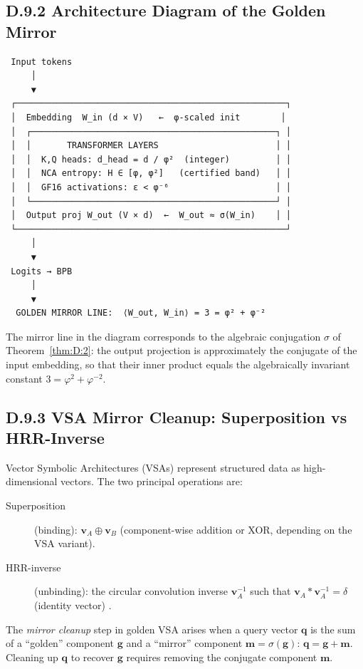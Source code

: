 \subsection*{D.9.2  Architecture Diagram of the Golden Mirror}

\begin{verbatim}
 Input tokens
     │
     ▼
 ┌─────────────────────────────────────────────────────┐
 │  Embedding  W_in (d × V)   ←  φ-scaled init        │
 │  ┌────────────────────────────────────────────────┐ │
 │  │       TRANSFORMER LAYERS                       │ │
 │  │  K,Q heads: d_head = d / φ²  (integer)         │ │
 │  │  NCA entropy: H ∈ [φ, φ²]   (certified band)   │ │
 │  │  GF16 activations: ε < φ⁻⁶                     │ │
 │  └────────────────────────────────────────────────┘ │
 │  Output proj W_out (V × d)  ←  W_out ≈ σ(W_in)    │ │
 └─────────────────────────────────────────────────────┘
     │
     ▼
 Logits → BPB
     │
     ▼
  GOLDEN MIRROR LINE:  ⟨W_out, W_in⟩ = 3 = φ² + φ⁻²
\end{verbatim}

\noindent The mirror line in the diagram corresponds to the algebraic conjugation
$\sigma$ of Theorem~\ref{thm:D:2}: the output projection is approximately the
conjugate of the input embedding, so that their inner product equals the
algebraically invariant constant $3 = \varphi^2 + \varphi^{-2}$.

\subsection*{D.9.3  VSA Mirror Cleanup: Superposition vs HRR-Inverse}

Vector Symbolic Architectures (VSAs) \cite{gayler_vsa_2003,kanerva_hyperdimensional}
represent structured data as high-dimensional vectors.  The two principal
operations are:
\begin{description}
  \item[Superposition] (binding): $\mathbf{v}_A \oplus \mathbf{v}_B$ (component-wise
    addition or XOR, depending on the VSA variant).
  \item[HRR-inverse] (unbinding): the circular convolution inverse
    $\mathbf{v}_A^{-1}$ such that $\mathbf{v}_A * \mathbf{v}_A^{-1} = \delta$
    (identity vector) \cite{plate_hrr}.
\end{description}
The \emph{mirror cleanup} step in golden VSA arises when a query vector $\mathbf{q}$
is the sum of a ``golden'' component $\mathbf{g}$ and a ``mirror'' component
$\mathbf{m} = \sigma(\mathbf{g})$:
$\mathbf{q} = \mathbf{g} + \mathbf{m}$.
Cleaning up $\mathbf{q}$ to recover $\mathbf{g}$ requires removing the
conjugate component $\mathbf{m}$.

